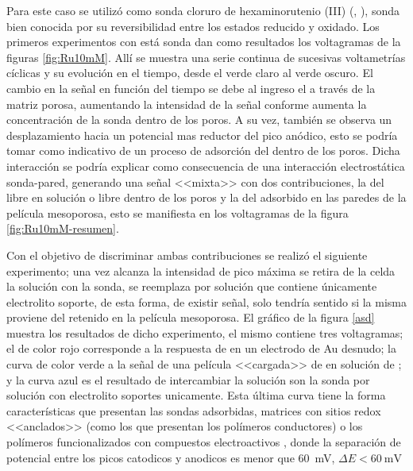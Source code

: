 		Para este caso se utilizó como sonda cloruro de hexaminorutenio (III) (\aminorutenioCompleto, \ru), sonda bien conocida por su reversibilidad entre los estados reducido y oxidado. Los primeros experimentos con está sonda dan como resultados los voltagramas de la figuras \ref{fig:Ru10mM}. Allí se muestra una serie continua de sucesivas voltametrías cíclicas y su evolución en el tiempo, desde el verde claro al verde oscuro. El cambio en la señal en función del tiempo se debe al ingreso el \ru\space a través de la matriz porosa, aumentando la intensidad de la señal conforme aumenta la concentración de la sonda dentro de los poros. A su vez, también se observa un desplazamiento hacia un potencial mas reductor del pico anódico, esto se podría tomar como indicativo de un proceso de adsorción del \ru\space dentro de los poros. Dicha interacción se podría explicar como consecuencia de una interacción electrostática sonda-pared, generando una señal <<mixta>> con dos contribuciones, la del \ru\space libre en solución o libre dentro de los poros y la del adsorbido en las paredes de la película mesoporosa, esto se manifiesta en los voltagramas de la figura \ref{fig:Ru10mM-resumen}.

		Con el objetivo de discriminar ambas contribuciones se realizó el siguiente experimento; una vez alcanza la intensidad de pico máxima se retira de la celda la solución con la sonda, se reemplaza por solución que contiene únicamente electrolito soporte, de esta forma, de existir señal, solo tendría sentido si la misma proviene del \ru\space retenido en la película mesoporosa. El gráfico de la figura \ref{asd} muestra los resultados de dicho experimento, el mismo contiene tres voltagramas; el de color rojo corresponde a la respuesta de \ru\space en un electrodo de Au desnudo; la curva de color verde a la señal de una película <<cargada>> de \ru\space en solución de \ru; y la curva azul es el resultado de intercambiar la solución son la sonda por solución con electrolito soportes unicamente. Esta última curva tiene la forma características que presentan las sondas adsorbidas, matrices con sitios redox <<anclados>>\cite{Ybarra2005} (como los que presentan los polímeros conductores) o los polímeros funcionalizados con compuestos electroactivos \cite{Rohlfing2005,Vila2015}, donde la separación de potencial entre los picos catodicos y anodicos es menor que \SI{60}{\milli\volt}, $\Delta E < \SI{60}{\milli\volt}$ 


